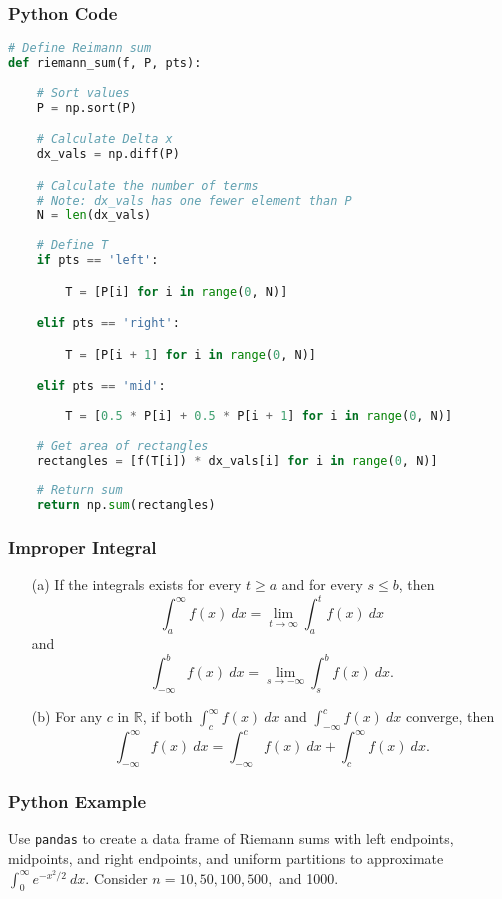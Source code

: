 \documentclass{beamer}
\begin{document}
\begin{frame}[fragile]
\frametitle{Python Code}

\begin{lstlisting}[language=Python]
# Define Reimann sum
def riemann_sum(f, P, pts):
    
    # Sort values
    P = np.sort(P)

    # Calculate Delta x
    dx_vals = np.diff(P)

    # Calculate the number of terms
    # Note: dx_vals has one fewer element than P
    N = len(dx_vals)
    
    # Define T
    if pts == 'left':

        T = [P[i] for i in range(0, N)]

    elif pts == 'right':

        T = [P[i + 1] for i in range(0, N)]

    elif pts == 'mid':
        
        T = [0.5 * P[i] + 0.5 * P[i + 1] for i in range(0, N)]
        
    # Get area of rectangles
    rectangles = [f(T[i]) * dx_vals[i] for i in range(0, N)]
    
    # Return sum
    return np.sum(rectangles)
\end{lstlisting}
\end{frame}

\begin{frame}
\frametitle{Improper Integral}
\begin{Definition}
{
\linespread{0.5}
\begin{enumerate}
\item[(a)] If the integrals exists for every $t \geq a$ and for every $s \leq b$, then
$$
\int_a^\infty f(x)\ dx = \lim_{t\to\infty}\int_a^t f(x)\ dx
$$
and
$$
\int_{-\infty}^b f(x)\ dx = \lim_{s\to-\infty}\int_s^b f(x)\ dx.
$$
\item[(b)] For any $c$ in $\mathbb{R}$, if both $\displaystyle\int_c^\infty f(x)\ dx$ and $\displaystyle\int_{-\infty}^c f(x)\ dx$ converge, then 
$$
\int_{-\infty}^\infty f(x)\ dx = \int_{-\infty}^c f(x)\ dx + \int_c^\infty f(x)\ dx.
$$
\end{enumerate}
}
\end{Definition}
\end{frame}

\begin{frame}
\frametitle{Python Example}
\begin{Example}
Use \texttt{pandas} to create a data frame of Riemann sums with left endpoints, midpoints, and right endpoints, and uniform partitions to approximate $\displaystyle\int_0^\infty e^{-x^2/2}\ dx$. Consider $n = 10, 50, 100, 500,$ and 1000.
\end{Example}
\end{frame}
\end{document}
